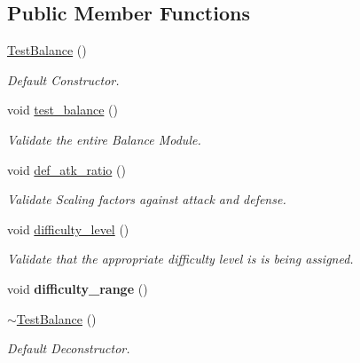 \subsection*{Public Member Functions}
\begin{DoxyCompactItemize}
\item 
\mbox{\label{classTestBalance_a0b015a3d015cf1931552d46e19ac9734}} 
\mbox{\hyperlink{classTestBalance_a0b015a3d015cf1931552d46e19ac9734}{Test\+Balance}} ()
\begin{DoxyCompactList}\small\item\em Default Constructor. \end{DoxyCompactList}\item 
void \mbox{\hyperlink{classTestBalance_a2b91f1822cb997e82a3bc5787f506cfb}{test\+\_\+balance}} ()
\begin{DoxyCompactList}\small\item\em Validate the entire Balance Module. \end{DoxyCompactList}\item 
\mbox{\label{classTestBalance_a41811f0ef5f82115aab85113d46d977a}} 
void \mbox{\hyperlink{classTestBalance_a41811f0ef5f82115aab85113d46d977a}{def\+\_\+atk\+\_\+ratio}} ()
\begin{DoxyCompactList}\small\item\em Validate Scaling factors against attack and defense. \end{DoxyCompactList}\item 
\mbox{\label{classTestBalance_a9221086b724b0d24f0d96a903f98adda}} 
void \mbox{\hyperlink{classTestBalance_a9221086b724b0d24f0d96a903f98adda}{difficulty\+\_\+level}} ()
\begin{DoxyCompactList}\small\item\em Validate that the appropriate difficulty level is is being assigned. \end{DoxyCompactList}\item 
\mbox{\label{classTestBalance_a6ac9d4c6486f4fcf5604b6cc934a6489}} 
void {\bfseries difficulty\+\_\+range} ()
\item 
\mbox{\label{classTestBalance_a4c8c816b787fa576d8112b6677f5c27e}} 
\mbox{\hyperlink{classTestBalance_a4c8c816b787fa576d8112b6677f5c27e}{$\sim$\+Test\+Balance}} ()
\begin{DoxyCompactList}\small\item\em Default Deconstructor. \end{DoxyCompactList}\end{DoxyCompactItemize}

